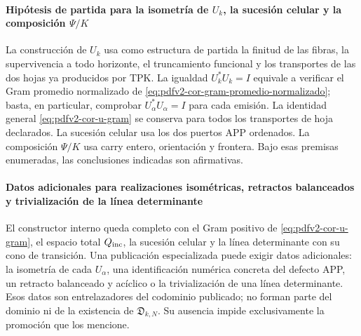 \paragraph{Hipótesis de partida para la isometría de \(U_k\), la sucesión celular y la composición \(\Psi/K\)}
La construcción de \(U_k\) usa como estructura de partida la finitud de las
fibras, la supervivencia a todo horizonte, el truncamiento funcional y los
transportes de las dos hojas ya producidos por TPK\@. La igualdad
\(U_k^*U_k=I\) equivale a verificar el Gram promedio normalizado de
\eqref{eq:pdfv2-cor-gram-promedio-normalizado}; basta, en particular,
comprobar \(U_\alpha^*U_\alpha=I\) para cada emisión. La identidad general
\eqref{eq:pdfv2-cor-u-gram} se conserva para todos los transportes de hoja
declarados. La sucesión celular usa
los dos puertos APP ordenados. La composición \(\Psi/K\) usa carry entero,
orientación y frontera. Bajo esas premisas enumeradas, las conclusiones
indicadas son afirmativas.

\paragraph{Datos adicionales para realizaciones isométricas, retractos balanceados y trivialización de la línea determinante}
El constructor interno queda completo con el Gram positivo de
\eqref{eq:pdfv2-cor-u-gram}, el espacio total \(Q_{\rm inc}\), la sucesión
celular y la línea determinante con su cono de transición. Una publicación
especializada puede exigir datos adicionales: la isometría de cada
\(U_\alpha\), una identificación numérica concreta del defecto APP, un
retracto balanceado y acíclico o la trivialización de una línea
determinante. Esos datos son entrelazadores del codominio publicado; no
forman parte del dominio ni de la existencia de
\(\mathfrak D_{k,N}\). Su ausencia impide exclusivamente la promoción que
los mencione.

